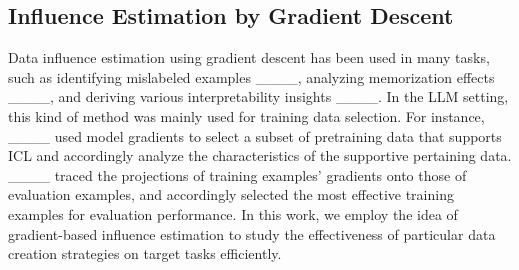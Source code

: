 \subsection{Influence Estimation by Gradient Descent}

Data influence estimation using gradient descent has been used in many tasks, such as identifying mislabeled examples ____, analyzing memorization effects ____, and deriving various interpretability insights ____. In the LLM setting, this kind of method was mainly used for training data selection. For instance, ____ used model gradients to select a subset of pretraining data
that supports ICL and accordingly analyze the characteristics of the supportive pertaining data. ____ traced the projections of training examples' gradients onto those of evaluation examples, and accordingly selected the most effective training examples for evaluation performance. In this work, we employ the idea of gradient-based influence estimation to study the effectiveness of particular data creation strategies on target tasks efficiently.